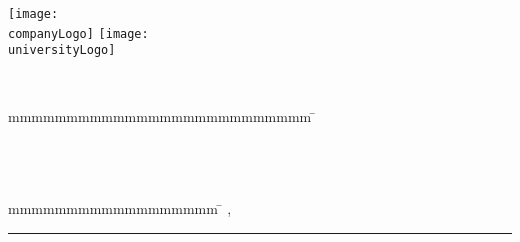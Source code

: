 \begin{titlepage}
	\texttt{[image: \\companyLogo]}
	\hfill
	\texttt{[image: \\universityLogo]}
	\centering
	
	{\large \ \par}
	{\scshape\LARGE \reportType \par}	
	\vspace{1.5cm}
	{\huge\bfseries \thesisTitle \par}
	\vspace{1.5cm}
	\vspace{1cm}
	{\large \byTitle \par}
	{\Large\itshape \authorName \par}
	\vfill
	\begin{tabbing}
		mmmmmmmmmmmmmmmmmmmmmmmmmm			\= \kill 			%

		\textbf{\supervisorTitle}			\> \supervisorName \\
	\end{tabbing}
\end{titlepage}

\cleardoublepage
\chapter*{\declarationTitle}
\declaration
\vspace{4em}

\begin{tabbing}
	mmmmmmmmmmmmmmmmmm	\= \kill 	%
	\city, \ \signatureDate 	\> \rule{6cm}{0.4pt} \\
				\> \authorName
\end{tabbing}



\cleardoublepage
\begin{abstract}
	\abstractText
\end{abstract}
\cleardoublepage
